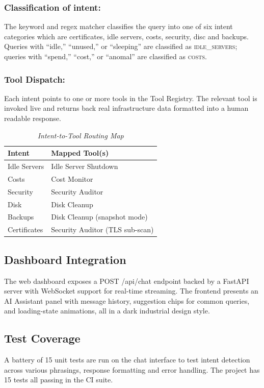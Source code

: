 \documentclass{ieeeaccess}
\begin{document}
\begin{enumerate}
   \subsubsection{Classification of intent:}
  The keyword and regex matcher classifies the query into one of six intent categories which are  certificates, idle servers, costs, security, disc and backups. Queries with ``idle,'' ``unused,'' or ``sleeping'' are classified as \textsc{idle\_servers}; queries with ``spend,'' ``cost,'' or ``anomal'' are classified as \textsc{costs}.
   \subsubsection{Tool Dispatch:} Each intent points to one or more tools in the Tool Registry. The relevant tool is invoked live and returns back real infrastructure data formatted into a human readable response.
\end{enumerate}

\begin{table}[ht]
\caption{\textit{Intent-to-Tool Routing Map}}
\centering
\begin{tabular}{ll}
\toprule
\textbf{Intent} & \textbf{Mapped Tool(s)} \\
\midrule
Idle Servers & Idle Server Shutdown \\
Costs        & Cost Monitor \\
Security     & Security Auditor \\
Disk         & Disk Cleanup \\
Backups      & Disk Cleanup (snapshot mode) \\
Certificates & Security Auditor (TLS sub-scan) \\
\bottomrule
\end{tabular}
\label{tab:routing}
\end{table}

\subsection{Dashboard Integration}
The web dashboard exposes a POST /api/chat endpoint backed by a FastAPI server with WebSocket support for real-time streaming. The frontend presents an AI Assistant panel with message history, suggestion chips for common queries, and loading-state animations, all in a dark industrial design style.

\subsection{Test Coverage}
A battery of 15 unit tests are run on the chat interface to test intent detection across various phrasings, response formatting and error handling. The project has 15 tests all passing in the CI suite.
\end{document}
